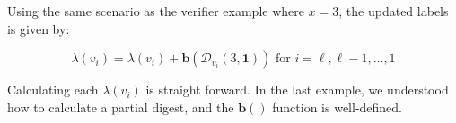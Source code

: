 \documentclass[11pt, letterpaper, oneside]{article}
\begin{document}
Using the same scenario as the verifier example where $x = 3$, the updated labels is given by:

\begin{equation}
\lambda(v_{i}) = \lambda(v_{i}) + \textbf{b}( \mathcal{D}_{v_{i}}(3, \textbf{1}) ) \textrm{ for } i = \ell, \ell -1, \ldots, 1  
\end{equation}

Calculating each $\lambda(v_{i})$ is straight forward.  In the last example, we understood how to calculate a partial digest, and the $\textbf{b}()$ function is well-defined.









\end{document}
